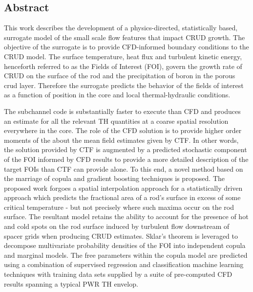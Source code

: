 
\subsection*{Abstract}

\small{

This work describes the development of a physics-directed, statistically based,
surrogate model of the small scale flow features that impact CRUD growth. The objective of the surrogate
is to provide CFD-informed boundary conditions to the CRUD model. The surface temperature, heat
flux and turbulent kinetic energy, henceforth referred to as the Fields of Interest (FOI),
govern the growth rate of CRUD on the surface of the rod and the
precipitation of boron in the porous crud layer. Therefore the surrogate predicts the behavior of the
fields of interest as a function of position in the core and local thermal-hydraulic conditions.

The subchannel code is substantially faster to execute than CFD
and produces an estimate for all the relevant TH quantities at a coarse spatial resolution everywhere in
the core. The role of the CFD solution is to provide higher order moments of the about the mean field estimates
given by CTF. In other words, the solution provided by CTF is augmented by a predicted stochastic
component of the FOI informed by CFD results to provide a more detailed description of the target
FOIs than CTF can provide alone. To this end, a novel method based on the marriage of copula and
gradient boosting techniques is proposed. The proposed work forgoes a spatial interpolation approach
for a statistically driven approach which predicts the fractional area of a rod’s surface in excess of some
critical temperature - but not precisely where such maxima occur on the rod surface.
The resultant model retains the ability to account for the presence
of hot and cold spots on the rod surface induced by turbulent flow downstream of spacer grids when
producing CRUD estimates. Sklar’s theorem is leveraged to decompose multivariate probability densities
of the FOI into independent copula and marginal models. The free parameters within the copula model
are predicted using a combination of supervised regression and classification machine learning techniques
with training data sets supplied by a suite of pre-computed CFD results spanning a typical PWR TH
envelop.
}
